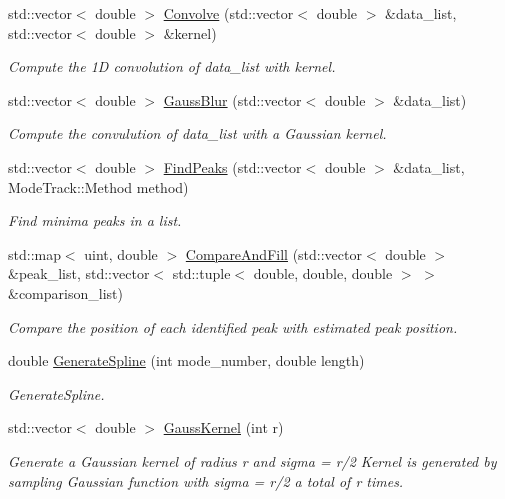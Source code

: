 \begin{DoxyCompactItemize}
std\-::vector$<$ double $>$ \hyperlink{class_mode_track_a8d08e12e9d882c875e6f7f4b8539f542}{Convolve} (std\-::vector$<$ double $>$ \&data\-\_\-list, std\-::vector$<$ double $>$ \&kernel)
\begin{DoxyCompactList}\small\item\em Compute the 1\-D convolution of data\-\_\-list with kernel. \end{DoxyCompactList}\item 
std\-::vector$<$ double $>$ \hyperlink{class_mode_track_aa315defc02162bed269fa981a01382b8}{Gauss\-Blur} (std\-::vector$<$ double $>$ \&data\-\_\-list)
\begin{DoxyCompactList}\small\item\em Compute the convulution of data\-\_\-list with a Gaussian kernel. \end{DoxyCompactList}\item 
std\-::vector$<$ double $>$ \hyperlink{class_mode_track_a69dab14db20b8ffdcae63914fb2e0c83}{Find\-Peaks} (std\-::vector$<$ double $>$ \&data\-\_\-list, Mode\-Track\-::\-Method method)
\begin{DoxyCompactList}\small\item\em Find minima peaks in a list. \end{DoxyCompactList}\item 
std\-::map$<$ uint, double $>$ \hyperlink{class_mode_track_a83776f06fac4ccff81ae76405dc5bee8}{Compare\-And\-Fill} (std\-::vector$<$ double $>$ \&peak\-\_\-list, std\-::vector$<$ std\-::tuple$<$ double, double, double $>$ $>$ \&comparison\-\_\-list)
\begin{DoxyCompactList}\small\item\em Compare the position of each identified peak with estimated peak position. \end{DoxyCompactList}\item 
double \hyperlink{class_mode_track_a7960f1ee58a1a420814843ca0f8c0ae4}{Generate\-Spline} (int mode\-\_\-number, double length)
\begin{DoxyCompactList}\small\item\em Generate\-Spline. \end{DoxyCompactList}\item 
std\-::vector$<$ double $>$ \hyperlink{class_mode_track_ad69c546f3d3ac916b0f00c7aa2917903}{Gauss\-Kernel} (int r)
\begin{DoxyCompactList}\small\item\em Generate a Gaussian kernel of radius r and sigma = r/2 Kernel is generated by sampling Gaussian function with sigma = r/2 a total of r times. \end{DoxyCompactList}\item 

\end{DoxyCompactItemize}
